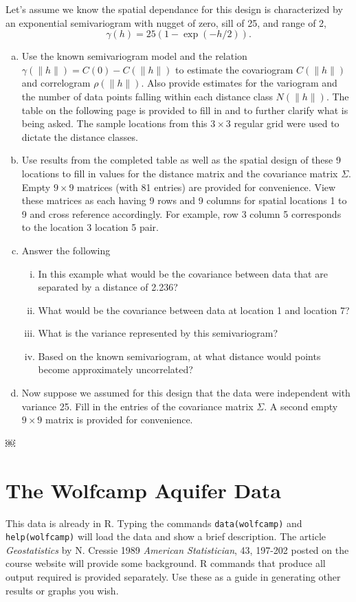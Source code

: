 \documentclass[letterpaper, 12pt]{article}
\begin{document}
Let’s assume we know the spatial dependance for this design is characterized by an exponential semivariogram with nugget of zero, sill of 25, and range of 2,
\[
\gamma(h) = 25 (1 - \exp(-h/2)).
\]
\begin{enumerate}[a.]
\item
Use the known semivariogram model and the relation $γ(\|h\|) = C(0) - C(\|h\|)$ to estimate the covariogram $C(\|h\|)$ and correlogram $\rho(\|h\|)$. Also provide estimates for the variogram and the number of data points falling within each distance class $N(\|h\|)$. The table on the following page is provided to fill in and to further clarify what is being asked. The sample locations from this $3 \times 3$ regular grid were used to dictate the distance classes.
\item
Use results from the completed table as well as the spatial design of these 9 locations to fill in values for the distance matrix and the covariance matrix $\Sigma$. Empty $9 \times 9$ matrices (with 81 entries) are provided for convenience. View these matrices as each having 9 rows and 9 columns for spatial locations 1 to 9 and cross reference accordingly. For example, row 3 column 5 corresponds to the location 3 location 5 pair.
\item
Answer the following
\begin{enumerate}[(i)]
\item
In this example what would be the covariance between data that are separated by a distance of 2.236?
\item
What would be the covariance between data at location 1 and location 7?
\item
What is the variance represented by this semivariogram?
\item
Based on the known semivariogram, at what distance would points become approximately uncorrelated?
\end{enumerate}
\item
Now suppose we assumed for this design that the data were independent with variance 25. Fill in the entries of the covariance matrix $\Sigma$. A second empty $9 \times 9$ matrix is provided for convenience.
\end{enumerate}
￼

\section{The Wolfcamp Aquifer Data}

This data is already in R. Typing the commands \texttt{data(wolfcamp)} and \texttt{help(wolfcamp)} will load the data and show a brief description. The article \textit{Geostatistics} by N. Cressie 1989 \textit{American Statistician}, 43, 197-202 posted on the course website will provide some background. R commands that produce all output required is provided separately. Use these as a guide in generating other results or graphs you wish.
\end{document}

